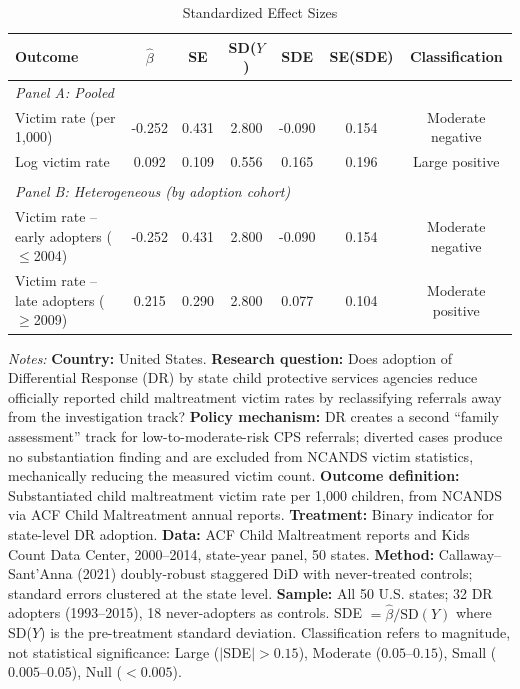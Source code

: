 \begin{table}[htbp]
\centering
\begin{threeparttable}
\caption{Standardized Effect Sizes}
\label{tab:sde}
\footnotesize
\begin{tabular}{lcccccc}
\toprule
Outcome & $\hat{\beta}$ & SE & SD($Y$) & SDE & SE(SDE) & Classification \\
\midrule
\multicolumn{7}{l}{\textit{Panel A: Pooled}} \\[3pt]
Victim rate (per 1,000) & -0.252 & 0.431 & 2.800 & -0.090 & 0.154 & Moderate negative \\
Log victim rate & 0.092 & 0.109 & 0.556 & 0.165 & 0.196 & Large positive \\
\\
\multicolumn{7}{l}{\textit{Panel B: Heterogeneous (by adoption cohort)}} \\[3pt]
Victim rate -- early adopters ($\leq$2004) & -0.252 & 0.431 & 2.800 & -0.090 & 0.154 & Moderate negative \\
Victim rate -- late adopters ($\geq$2009) & 0.215 & 0.290 & 2.800 & 0.077 & 0.104 & Moderate positive \\
\bottomrule
\end{tabular}
\begin{tablenotes}
\item \textit{Notes:} \textbf{Country:} United States. \textbf{Research question:} Does adoption of Differential Response (DR) by state child protective services agencies reduce officially reported child maltreatment victim rates by reclassifying referrals away from the investigation track? \textbf{Policy mechanism:} DR creates a second ``family assessment'' track for low-to-moderate-risk CPS referrals; diverted cases produce no substantiation finding and are excluded from NCANDS victim statistics, mechanically reducing the measured victim count. \textbf{Outcome definition:} Substantiated child maltreatment victim rate per 1,000 children, from NCANDS via ACF Child Maltreatment annual reports. \textbf{Treatment:} Binary indicator for state-level DR adoption. \textbf{Data:} ACF Child Maltreatment reports and Kids Count Data Center, 2000--2014, state-year panel, 50 states. \textbf{Method:} Callaway--Sant'Anna (2021) doubly-robust staggered DiD with never-treated controls; standard errors clustered at the state level. \textbf{Sample:} All 50 U.S. states; 32 DR adopters (1993--2015), 18 never-adopters as controls. SDE $= \hat{\beta} / \text{SD}(Y)$ where SD($Y$) is the pre-treatment standard deviation. Classification refers to magnitude, not statistical significance: Large ($|$SDE$| > 0.15$), Moderate ($0.05$--$0.15$), Small ($0.005$--$0.05$), Null ($< 0.005$).
\end{tablenotes}
\end{threeparttable}
\end{table}
